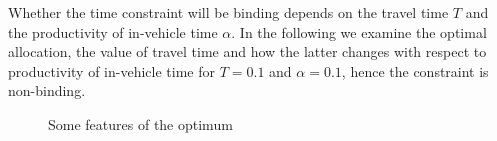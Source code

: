 \documentclass[12pt,a4paper,british]{article}
\begin{document}
Whether the time constraint will be binding depends on the travel time $T$ and the productivity of in-vehicle time $\alpha$. In the following we examine the optimal allocation, the value of travel time and how the latter changes with respect to productivity of in-vehicle time for $T=0.1$ and $\alpha = 0.1$, hence the constraint is non-binding.


%
%
%

\begin{figure}%
	\centering
	\quad
	\caption{Some features of the optimum}%
	\label{fig:example}%
\end{figure}



\end{document}
